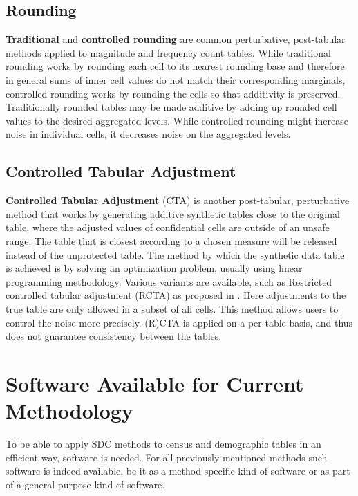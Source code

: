 \subsection{Rounding} 

\textbf{Traditional} and \textbf{controlled rounding} are common perturbative, post-tabular methods applied to magnitude and frequency count tables. While traditional rounding works by rounding each cell to its nearest rounding base and therefore in general sums of inner cell values do not match their corresponding marginals, controlled rounding \cite{controlledrounding} works by rounding the cells so that additivity is preserved. 
Traditionally rounded tables may be made additive by adding up rounded cell values to the desired aggregated levels. 
While controlled rounding might increase noise in individual cells, it decreases noise on the aggregated levels.

\subsection{Controlled Tabular Adjustment}

\textbf{Controlled Tabular Adjustment} (CTA) \cite{cta1, cta2} is another post-tabular, perturbative method that works by generating additive synthetic tables close to the original table, where the adjusted values of confidential cells are outside of an unsafe range. The table that is closest according to a chosen measure will be released instead of the unprotected table. The method by which the synthetic data table is achieved is by solving an optimization problem, usually using linear programming methodology. Various variants are available, such as Restricted controlled tabular adjustment (RCTA) as proposed in \cite{rcta}. Here adjustments to the true table are only allowed in a subset of all cells. This method allows users to control the noise more precisely. (R)CTA is applied on a per-table basis, and thus does not guarantee consistency between the tables.


\section{Software Available for Current Methodology}\label{section:software-methodology}
To be able to apply SDC methods to census and demographic tables in an efficient way, software is needed. For all previously mentioned methods such software is indeed available, be it as a method specific kind of software or as part of a general purpose kind of software. 

